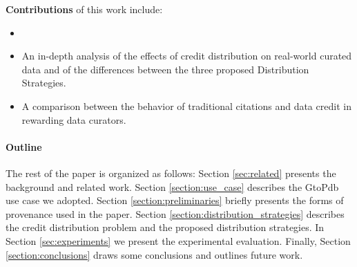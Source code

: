 \textbf{Contributions}
 of this work include:
\begin{itemize}
    \item {}
    \item An in-depth analysis of the effects of credit distribution on real-world curated data and of the differences between the three proposed Distribution Strategies.
    \item A comparison between the behavior of traditional citations and data credit in rewarding data curators.
\end{itemize}

\paragraph{\textbf{Outline}} The rest of the paper is organized as follows:
Section \ref{sec:related} presents the background and related work. Section \ref{section:use_case} describes the GtoPdb use case we adopted. Section \ref{section:preliminaries} briefly presents the forms of provenance used in the paper.  Section \ref{section:distribution_strategies} describes the credit distribution problem and the proposed distribution strategies.  In Section \ref{sec:experiments} we present the experimental evaluation. Finally, Section \ref{section:conclusions} draws some conclusions and outlines future work.



 
